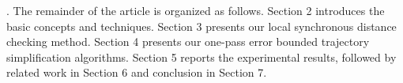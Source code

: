 .
The remainder of the article is organized as follows.
Section 2 introduces the basic concepts and techniques.
Section 3 presents our local synchronous distance checking method.
Section 4 presents our one-pass error bounded trajectory simplification algorithms.
Section 5 reports the experimental results, followed by related work in
Section 6 and conclusion in Section 7.





